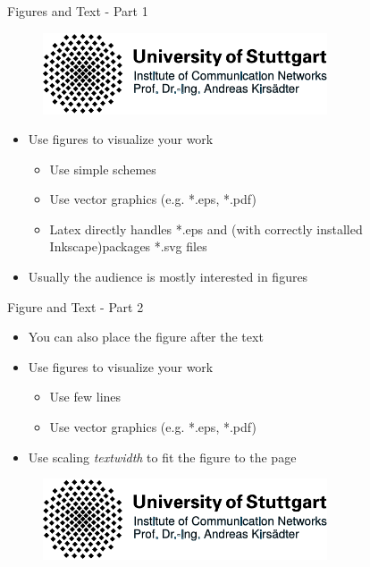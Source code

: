 \documentclass[english,american,german,aspectratio=169]{beamer}
\begin{document}
\begin{frame}{Figures and Text - Part 1 }

  \begin{figure}

    \begin{centering}
      \includegraphics[width=0.75\textwidth]{img/logo_vector_example}
      \par
    \end{centering}
  \end{figure}
  \medskip{}

  \begin{itemize}
    \item Use figures to visualize your work

      \begin{itemize}
        \item Use simple schemes
        \item Use vector graphics (e.g. {*}.eps, {*}.pdf)
        \item Latex directly handles {*}.eps and (with correctly
          installed Inkscape)packages
          {*}.svg files
      \end{itemize}
    \item Usually the audience is mostly interested in figures
  \end{itemize}
\end{frame}

\begin{frame}{Figure and Text - Part 2}

  \begin{itemize}
    \item You can also place the figure after the text
    \item Use figures to visualize your work

      \begin{itemize}
        \item Use few lines
        \item Use vector graphics (e.g. {*}.eps, {*}.pdf)
      \end{itemize}
    \item Use scaling \textit{textwidth }to fit the figure to the page\medskip{}
  \end{itemize}
  \begin{figure}
    \centering{}\includegraphics[width=0.75\textwidth]{img/logo_vector_example}
  \end{figure}

\end{frame}
\end{document}

